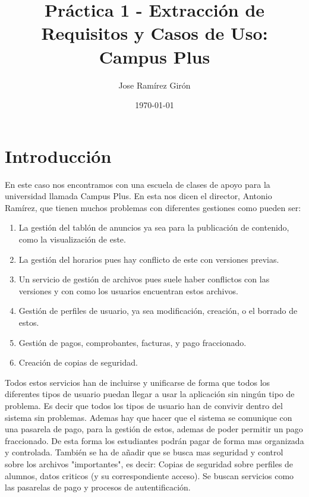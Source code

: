 \documentclass[11pt, a4paper]{article} %
\title{Práctica 1 - Extracción de Requisitos y Casos de Uso: Campus Plus}
\author{Jose Ramírez Girón}
\date{\today}
\begin{document}
\maketitle

\newpage

\tableofcontents

\newpage

\section{Introducción}
	En este caso nos encontramos con una escuela de clases de apoyo para la universidad llamada Campus Plus.
	En esta nos dicen el director, Antonio Ramírez, que tienen muchos problemas con diferentes gestiones como
	pueden ser:
	\begin{enumerate}
		\item La gestión del tablón de anuncios ya sea para la publicación de contenido, como la visualización de este.
		\item La gestión del horarios pues hay conflicto de este con versiones previas.
		\item Un servicio de gestión de archivos pues suele haber conflictos con las versiones y con como los usuarios
		encuentran estos archivos.
		\item Gestión de perfiles de usuario, ya sea modificación, creación, o el borrado de estos.
		\item Gestión de pagos, comprobantes, facturas, y pago fraccionado.
		\item Creación de copias de seguridad.
	\end{enumerate}

	Todos estos servicios han de incluirse y unificarse de forma que todos los diferentes tipos de usuario puedan
	llegar a usar la aplicación sin ningún tipo de problema. Es decir que todos los tipos de usuario han de convivir
	dentro del sistema sin problemas. \newline
	Ademas hay que hacer que el sistema se comunique con una pasarela de pago, para la gestión de estos, ademas de poder
	permitir un pago fraccionado. De esta forma los estudiantes podrán pagar de forma mas organizada y controlada.\newline
	También se ha de añadir que se busca mas seguridad y control sobre los archivos "importantes", es decir: Copias de
	seguridad sobre perfiles de alumnos, datos criticos (y su correspondiente acceso). Se buscan servicios como las
	pasarelas de pago y procesos de autentificación.
\end{document}
